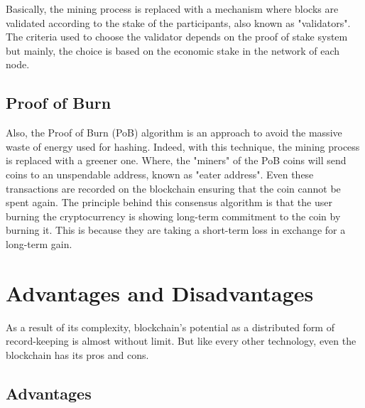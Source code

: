 Basically, the mining process is replaced with a mechanism where blocks are
validated according to the stake of the participants, also known as "validators".
The criteria used to choose the validator depends on the proof of stake system
but mainly, the choice is based on the economic stake in the network of 
each node.\cite{binancevision}\cite{consensusmedium}

\subsection{Proof of Burn}
\label{sec:pob}

Also, the Proof of Burn (PoB) algorithm is an approach to avoid the massive 
waste of energy used for hashing. Indeed, with this technique, the mining
process is replaced with a greener one. Where, the "miners" of the PoB 
coins will send coins to an  unspendable address, known as "eater address".
Even these transactions are recorded on the blockchain ensuring that the coin 
cannot be spent again. The principle behind this consensus algorithm is that
the user burning the cryptocurrency is showing long-term commitment to the
coin by burning it. This is because they are taking a short-term loss in 
exchange for a long-term gain.\cite{consensusmedium}




\section{Advantages and Disadvantages}
\label{sec:evaluate}

As a result of its complexity, blockchain's potential as a distributed 
form of record-keeping is almost without limit. But like every other 
technology, even the blockchain has its pros and cons. 

\subsection{Advantages}
\label{sec:advantages}

